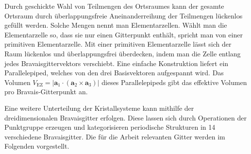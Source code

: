 Durch geschickte Wahl von Teilmengen des Ortsraumes kann der gesamte Ortsraum durch überlappungsfreie Aneinanderreihung
der Teilmengen lückenlos gefüllt werden.
Solche Mengen nennt man Elementarzellen.
Wählt man die Elementarzelle so, dass sie nur einen Gitterpunkt enthält, spricht man von einer primitiven
Elementarzelle.
Mit einer primitiven Elementarzelle lässt sich der Raum lückenlos und überlappungsfrei überdecken, indem man die Zelle
entlang jedes Bravaisgittervektors verschiebt.
Eine einfache Konstruktion liefert ein Parallelepiped, welches von den drei Basisvektoren aufgespannt wird.
Das Volumen $V_\mathrm{EZ}= \lvert \mathbf{a}_1 \cdot (\mathbf{a}_2 \times  \mathbf{a}_3) \rvert$ dieses
Parallelepipeds gibt das effektive Volumen pro Bravais-Gitterpunkt an.
\autocite[90-91]{Ashcroft}

Eine weitere Unterteilung der Kristallsysteme kann mithilfe der dreidimensionalen Bravaisgitter erfolgen.
Diese lassen sich durch Operationen der Punktgruppe erzeugen und kategorisieren periodische Strukturen
in 14 verschiedene Bravaisgitter. \autocite[37]{Grundmann}
Die für die Arbeit relevanten Gitter werden im Folgenden vorgestellt.

